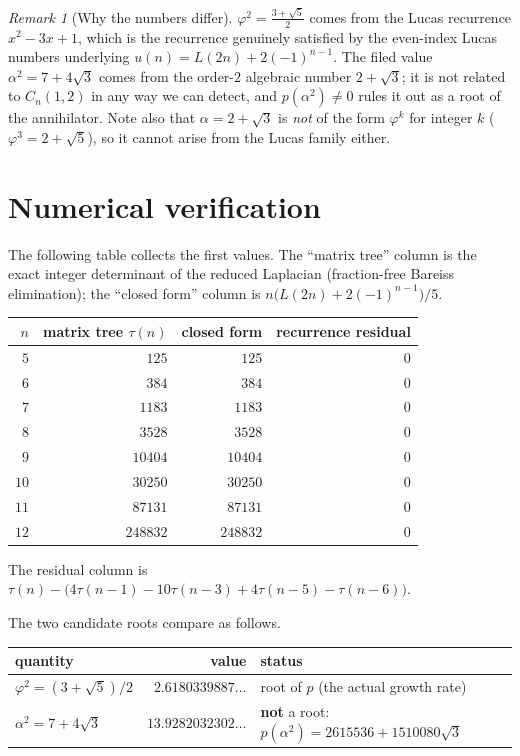 \documentclass[11pt]{article}
\theoremstyle{definition}
\theoremstyle{remark}
\newtheorem{remark}[theorem]{Remark}
\newcommand{\tauc}{\tau}
\begin{document}
\begin{remark}[Why the numbers differ]
$\varphi^{2} = \frac{3+\sqrt5}{2}$ comes from the Lucas recurrence
$x^{2}-3x+1$, which is the recurrence genuinely satisfied by the even-index
Lucas numbers underlying $u(n) = L(2n)+2(-1)^{n-1}$. The filed value
$\alpha^{2} = 7+4\sqrt3$ comes from the order-$2$ algebraic number
$2+\sqrt3$; it is not related to $C_n(1,2)$ in any way we can detect, and
$p(\alpha^{2}) \neq 0$ rules it out as a root of the annihilator. Note also that
$\alpha = 2+\sqrt3$ is \emph{not} of the form $\varphi^{k}$ for integer $k$
($\varphi^{3} = 2+\sqrt5$), so it cannot arise from the Lucas family either.
\end{remark}

\section{Numerical verification}

The following table collects the first values. The ``matrix tree'' column is the
exact integer determinant of the reduced Laplacian (fraction-free Bareiss
elimination); the ``closed form'' column is
$n\bigl(L(2n)+2(-1)^{n-1}\bigr)/5$.

\begin{center}
\begin{tabular}{r r r r}
\toprule
$n$ & matrix tree $\tauc(n)$ & closed form & recurrence residual \\
\midrule
$5$  & $125$      & $125$      & $0$ \\
$6$  & $384$      & $384$      & $0$ \\
$7$  & $1183$     & $1183$     & $0$ \\
$8$  & $3528$     & $3528$     & $0$ \\
$9$  & $10404$    & $10404$    & $0$ \\
$10$ & $30250$    & $30250$    & $0$ \\
$11$ & $87131$    & $87131$    & $0$ \\
$12$ & $248832$   & $248832$   & $0$ \\
\bottomrule
\end{tabular}
\end{center}

\noindent The residual column is
$\tauc(n) - \bigl(4\tauc(n-1) - 10\tauc(n-3) + 4\tauc(n-5) - \tauc(n-6)\bigr)$.

The two candidate roots compare as follows.

\begin{center}
\begin{tabular}{l r l}
\toprule
quantity & value & status \\
\midrule
$\varphi^{2} = (3+\sqrt5)/2$ & $2.6180339887\ldots$ & root of $p$ (the actual growth rate) \\
$\alpha^{2} = 7+4\sqrt3$    & $13.9282032302\ldots$ & \textbf{not} a root: $p(\alpha^{2}) = 2615536 + 1510080\sqrt3$ \\
\bottomrule
\end{tabular}
\end{center}
\end{document}
